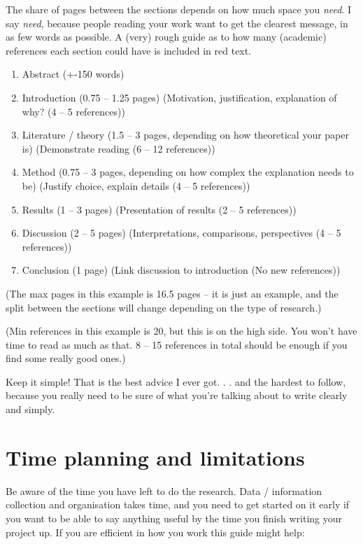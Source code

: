 \documentclass[
]{book}
\begin{document}
The share of pages between the sections depends on how much space you
\emph{need}. I say \emph{need}, because people reading your work want to get the
clearest message, in as few words as possible. A (very) rough guide as
to how many (academic) references each section could have is included in
red text.

\begin{enumerate}
\def\labelenumi{\arabic{enumi}.}
\item
  Abstract (+-150 words)
\item
  Introduction (0.75 -- 1.25 pages) (Motivation, justification,
  explanation of why? (4 -- 5 references))
\item
  Literature / theory (1.5 -- 3 pages, depending on how theoretical
  your paper is) (Demonstrate reading (6 -- 12 references))
\item
  Method (0.75 -- 3 pages, depending on how complex the explanation
  needs to be) (Justify choice, explain details (4 -- 5 references))
\item
  Results (1 -- 3 pages) (Presentation of results (2 -- 5 references))
\item
  Discussion (2 -- 5 pages) (Interpretations, comparisons,
  perspectives (4 -- 5 references))
\item
  Conclusion (1 page) (Link discussion to introduction (No new
  references))
\end{enumerate}

(The max pages in this example is 16.5 pages -- it is just an example,
and the split between the sections will change depending on the type of
research.)

(Min references in this example is 20, but this is on the high side. You
won't have time to read as much as that. 8 -- 15 references in total
should be enough if you find some really good ones.)

Keep it simple! That is the best advice I ever got. . . and the hardest
to follow, because you really need to be sure of what you're talking
about to write clearly and simply.

\hypertarget{time-planning-and-limitations}{%
\chapter{Time planning and limitations}\label{time-planning-and-limitations}}

Be aware of the time you have left to do the research. Data /
information collection and organisation takes time, and you need to get
started on it early if you want to be able to say anything useful by the
time you finish writing your project up. If you are efficient in how you
work this guide might help:
\end{document}
